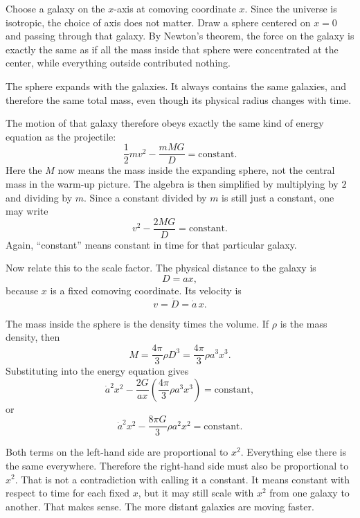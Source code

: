 Choose a galaxy on the \(x\)-axis at comoving coordinate \(x\). Since the universe is isotropic, the choice of axis does not matter. Draw a sphere centered on \(x=0\) and passing through that galaxy. By Newton's theorem, the force on the galaxy is exactly the same as if all the mass inside that sphere were concentrated at the center, while everything outside contributed nothing.

The sphere expands with the galaxies. It always contains the same galaxies, and therefore the same total mass, even though its physical radius changes with time.

The motion of that galaxy therefore obeys exactly the same kind of energy equation as the projectile:
\begin{equation}
\frac{1}{2}mv^2-\frac{mMG}{D}=\text{constant}.
\end{equation}
Here the \(M\) now means the mass inside the expanding sphere, not the central mass in the warm-up picture. The algebra is then simplified by multiplying by \(2\) and dividing by \(m\). Since a constant divided by \(m\) is still just a constant, one may write
\begin{equation}
v^2-\frac{2MG}{D}=\text{constant}.
\end{equation}
Again, ``constant'' means constant in time for that particular galaxy.

Now relate this to the scale factor. The physical distance to the galaxy is
\begin{equation}
D=ax,
\end{equation}
because \(x\) is a fixed comoving coordinate. Its velocity is
\begin{equation}
v=\dot D=\dot a\,x.
\end{equation}

The mass inside the sphere is the density times the volume. If \(\rho\) is the mass density, then
\begin{equation}
M=\frac{4\pi}{3}\rho D^3=\frac{4\pi}{3}\rho a^3x^3.
\end{equation}
Substituting into the energy equation gives
\begin{equation}
\dot a^2x^2-\frac{2G}{ax}\left(\frac{4\pi}{3}\rho a^3x^3\right)=\text{constant},
\end{equation}
or
\begin{equation}
\dot a^2x^2-\frac{8\pi G}{3}\rho a^2x^2=\text{constant}.
\end{equation}

Both terms on the left-hand side are proportional to \(x^2\). Everything else there is the same everywhere. Therefore the right-hand side must also be proportional to \(x^2\). That is not a contradiction with calling it a constant. It means constant with respect to time for each fixed \(x\), but it may still scale with \(x^2\) from one galaxy to another. That makes sense. The more distant galaxies are moving faster.

